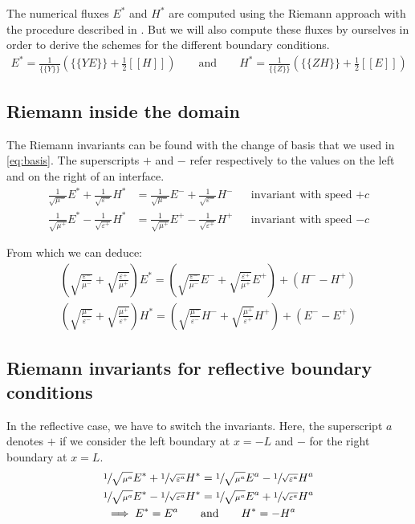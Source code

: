 \documentclass[11 pt]{article}
\begin{document}
The numerical fluxes $E^*$ and $H^*$ are computed using the Riemann approach with the procedure described in \cite[p. 39]{DGBook}. But we will also compute these fluxes by ourselves in order to derive the schemes for the different boundary conditions.
\begin{align*}
    E^* = \frac{1}{\{\!\{Y\}\!\}}\left(\{\!\{YE\}\!\} + \frac{1}{2} [\![H]\!]\right) \qquad \text{and} \qquad
    H^* = \frac{1}{\{\!\{Z\}\!\}} \left(\{\!\{ZH\}\!\} + \frac{1}{2} [\![E]\!]\right)
\end{align*}


\subsection{Riemann inside the domain}
The Riemann invariants can be found with the change of basis that we used in \eqref{eq:basis}. The superscripts $+$ and $-$ refer respectively to the values on the left and on the right of an interface.
\begin{align*}
    \frac{1}{\sqrt{\mu^{-}}} E^* + \frac{1}{\sqrt{\varepsilon^{-}}} H^* &= \frac{1}{\sqrt{\mu^{-}}} E^- + \frac{1}{\sqrt{\varepsilon^{-}}} H^- && \text{invariant with speed $+c$}\\
    \frac{1}{\sqrt{\mu^{+}}} E^* - \frac{1}{\sqrt{\varepsilon^{+}}} H^* &= \frac{1}{\sqrt{\mu^{+}}} E^+ - \frac{1}{\sqrt{\varepsilon^{+}}} H^+ && \text{invariant with speed $-c$}
\end{align*}

From which we can deduce:
{\small
\begin{align*}
    \left(\sqrt{\frac{\varepsilon^-}{\mu^-}} + \sqrt{\frac{\varepsilon^+}{\mu^+}}\right) E^* = \left(\sqrt{\frac{\varepsilon^-}{\mu^-}}E^- + \sqrt{\frac{\varepsilon^+}{\mu^+}}E^+\right) + \left(H^- - H^+\right)\\
    \left(\sqrt{\frac{\mu^-}{\varepsilon^-}} + \sqrt{\frac{\mu^+}{\varepsilon^+}}\right) H^* = \left(\sqrt{\frac{\mu^-}{\varepsilon^-}}H^- + \sqrt{\frac{\mu^+}{\varepsilon^+}}H^+\right) + \left(E^- - E^+\right)
\end{align*}
}

\subsection{Riemann invariants for reflective boundary conditions}
In the reflective case, we have to switch the invariants. Here, the superscript $a$ denotes $+$ if we consider the left boundary at $x=-L$ and $-$ for the right boundary at $x=L$.
\begin{align*}
    \sfrac{1}{\sqrt{\mu^{a}}} E^* + \sfrac{1}{\sqrt{\varepsilon^{a}}} H^* &= \sfrac{1}{\sqrt{\mu^{a}}} E^a - \sfrac{1}{\sqrt{\varepsilon^{a}}} H^a\\
    \sfrac{1}{\sqrt{\mu^{a}}} E^* - \sfrac{1}{\sqrt{\varepsilon^{a}}} H^* &= \sfrac{1}{\sqrt{\mu^{a}}} E^a + \sfrac{1}{\sqrt{\varepsilon^{a}}} H^a\\
    \implies E^* = E^a \qquad &\text{and} \qquad H^* = -H^a
\end{align*}
\end{document}
